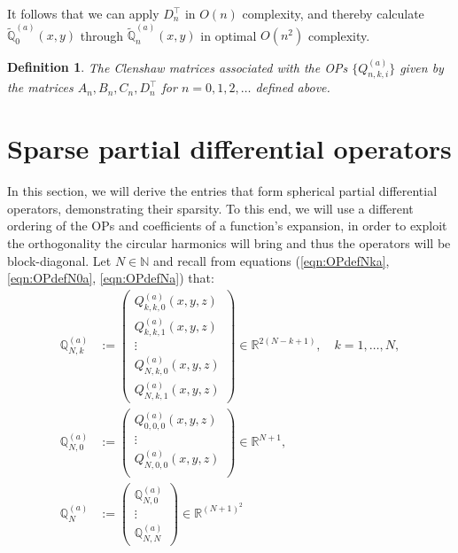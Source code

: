 \documentclass[11pt, oneside]{article}   	%
\newcommand{\bstodo}{\todo[color=pink]}
\newcommand{\R}{\mathbb{R}}
\newcommand{\N}{\mathbb{N}}
\newcommand{\Dnt}{D^\top_n}
\newcommand{\scop}{Q}
\newcommand{\scopnki}{\scop_{n,k,i}}
\newcommand{\scopa}{\scop^{(a)}}
\newcommand{\scopnkia}{\scopnki^{(a)}}
\newcommand{\bigscop}{{\mathbb{Q}}}
\newcommand{\bigscopa}{\bigscop^{(a)}}
\newcommand{\bigscopNa}{\bigscopa_{N}}
\newcommand{\bigscopNka}{\bigscopa_{N,k}}
\newcommand{\bigscopt}{\mathbb{\tilde{Q}}}
\newcommand{\bigscopta}{\bigscopt^{(a)}}
\newtheorem{definition}{Definition}
\begin{document}
It follows that we can apply $\Dnt$ in $O(n)$ complexity, and thereby calculate $\bigscopta_{0}(x,y)$  through $\bigscopta_{n}(x,y)$ in optimal $O(n^2)$ complexity. \bstodo{correct for this case}

\begin{definition}\label{def:clenshawmats}
The Clenshaw matrices associated with the OPs $\{\scopnkia\}$ given by the matrices $A_n, B_n, C_n, \Dnt$ for $n = 0,1,2,\dots$ defined above.
\end{definition}




%
\section{Sparse partial differential operators}\label{Section:PDOs}

In this section, we will derive the entries that form spherical partial differential operators, demonstrating their sparsity. To this end, we will use a different ordering of the OPs and coefficients of a function's expansion, in order to exploit the orthogonality the circular harmonics will bring and thus the operators will be block-diagonal. Let $N \in \N$ and recall from equations (\ref{eqn:OPdefNka}, \ref{eqn:OPdefN0a}, \ref{eqn:OPdefNa}) that: 
\begin{align*}
	\bigscopNka &:= 
		\begin{pmatrix}
			\scopa_{k,k,0}(x,y,z) \\
			\scopa_{k,k,1}(x,y,z) \\
			\vdots \\
			\scopa_{N,k,0}(x,y,z) \\
			\scopa_{N,k,1}(x,y,z)
		\end{pmatrix} \in \R^{2(N-k+1)},  \quad k = 1,\dots,N, \\ 
	\bigscopa_{N,0} &:= 
		\begin{pmatrix}
			\scopa_{0,0,0}(x,y,z) \\
			\vdots \\
			\scopa_{N,0,0}(x,y,z) \\
		\end{pmatrix} \in \R^{N+1}, \\
	\bigscopNa &:= 
		\begin{pmatrix}
			\bigscopa_{N,0} \\
			\vdots \\
			\bigscopa_{N,N}
		\end{pmatrix} \in \R^{(N+1)^2}
\end{align*}
\end{document}
